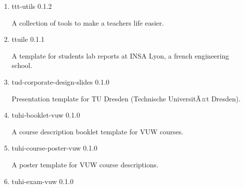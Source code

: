 \begin{enumerate}
  { ttt-lists } { 0.1.0 }

  Template to create student lists. Part of the ttt-collection to make a
  teachers life easier.
\item
  \href{/universe/package/ttt-utils/}{}

  { ttt-utils } { 0.1.2 }

  A collection of tools to make a teachers life easier.
\item
  \href{/universe/package/ttuile/}{}


  { ttuile } { 0.1.1 }

  A template for students\textquotesingle{} lab reports at INSA Lyon, a
  french engineering school.
\item
  \href{/universe/package/tud-corporate-design-slides/}{}


  { tud-corporate-design-slides } { 0.1.0 }

  Presentation template for TU Dresden (Technische UniversitÃ¤t
  Dresden).
\item
  \href{/universe/package/tuhi-booklet-vuw/}{}


  { tuhi-booklet-vuw } { 0.1.0 }

  A course description booklet template for VUW courses.
\item
  \href{/universe/package/tuhi-course-poster-vuw/}{}


  { tuhi-course-poster-vuw } { 0.1.0 }

  A poster template for VUW course descriptions.
\item
  \href{/universe/package/tuhi-exam-vuw/}{}


  { tuhi-exam-vuw } { 0.1.0 }


\end{enumerate}
